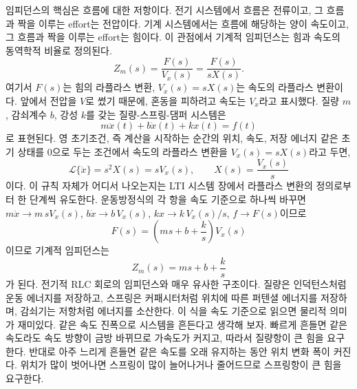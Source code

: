 임피던스의 핵심은 흐름에 대한 저항이다.
전기 시스템에서 흐름은 전류이고, 그 흐름과 짝을 이루는 effort는 전압이다.
기계 시스템에서는 흐름에 해당하는 양이 속도이고, 그 흐름과 짝을 이루는 effort는 힘이다.
이 관점에서 기계적 임피던스는 힘과 속도의 동역학적 비율로 정의된다.
\begin{equation}
  Z_m(s) = \frac{F(s)}{V_x(s)}
  =
  \frac{F(s)}{sX(s)}.
\end{equation}
여기서 $F(s)$는 힘의 라플라스 변환, $V_x(s)=sX(s)$는 속도의 라플라스 변환이다.
앞에서 전압을 $V$로 썼기 때문에, 혼동을 피하려고 속도는 $V_x$라고 표시했다.
질량 $m$, 감쇠계수 $b$, 강성 $k$를 갖는 질량-스프링-댐퍼 시스템은
\begin{equation}
  m \ddot{x}(t) + b \dot{x}(t) + k x(t) = f(t)
\end{equation}
로 표현된다.
영 초기조건, 즉 계산을 시작하는 순간의 위치, 속도, 저장 에너지 같은 초기 상태를 0으로 두는 조건에서 속도의 라플라스 변환을 $V_x(s)=sX(s)$라고 두면,
\begin{equation}
  \mathcal{L}\{\ddot{x}\}=s^2X(s)=sV_x(s), \qquad X(s)=\frac{V_x(s)}{s}
\end{equation}
이다.
이 규칙 자체가 어디서 나오는지는 LTI 시스템 장에서 라플라스 변환의 정의로부터 한 단계씩 유도한다.
운동방정식의 각 항을 속도 기준으로 하나씩 바꾸면 $m\ddot{x}\to m\,sV_x(s)$, $b\dot{x}\to b\,V_x(s)$, $kx\to k\,V_x(s)/s$, $f\to F(s)$이므로
%
\begin{equation}
  F(s) = \left(ms + b + \frac{k}{s}\right) V_x(s)
\end{equation}
이므로 기계적 임피던스는
\begin{equation}
  Z_m(s) = ms + b + \frac{k}{s}
\end{equation}
가 된다.
전기적 RLC 회로의 임피던스와 매우 유사한 구조이다.
질량은 인덕턴스처럼 운동 에너지를 저장하고, 스프링은 커패시터처럼 위치에 따른 퍼텐셜 에너지를 저장하며, 감쇠기는 저항처럼 에너지를 소산한다.
이 식을 속도 기준으로 읽으면 물리적 의미가 재미있다.
같은 속도 진폭으로 시스템을 흔든다고 생각해 보자.
빠르게 흔들면 같은 속도라도 속도 방향이 금방 바뀌므로 가속도가 커지고, 따라서 질량항이 큰 힘을 요구한다.
반대로 아주 느리게 흔들면 같은 속도를 오래 유지하는 동안 위치 변화 폭이 커진다.
위치가 많이 벗어나면 스프링이 많이 늘어나거나 줄어드므로 스프링항이 큰 힘을 요구한다.

